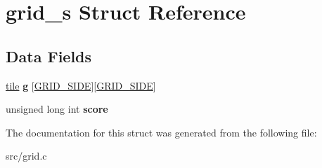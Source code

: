 \hypertarget{structgrid__s}{\section{grid\-\_\-s Struct Reference}
\label{structgrid__s}
}
\subsection*{Data Fields}
\begin{DoxyCompactItemize}
\item 
\hypertarget{structgrid__s_a318046e2e11880e7372f81a73bf1a436}{\hyperlink{grid_8h_a9a1fe03e260de47d12663efab5b0eec0}{tile} {\bfseries g} \mbox{[}\hyperlink{grid_8h_a11a5c4dfb9111e9a171cc4e8853f5663}{G\-R\-I\-D\-\_\-\-S\-I\-D\-E}\mbox{]}\mbox{[}\hyperlink{grid_8h_a11a5c4dfb9111e9a171cc4e8853f5663}{G\-R\-I\-D\-\_\-\-S\-I\-D\-E}\mbox{]}}\label{structgrid__s_a318046e2e11880e7372f81a73bf1a436}

\item 
\hypertarget{structgrid__s_afa23aef9d235eb9bd53c89f1a5179645}{unsigned long int {\bfseries score}}\label{structgrid__s_afa23aef9d235eb9bd53c89f1a5179645}

\end{DoxyCompactItemize}


The documentation for this struct was generated from the following file\-:\begin{DoxyCompactItemize}
\item 
src/grid.\-c\end{DoxyCompactItemize}

